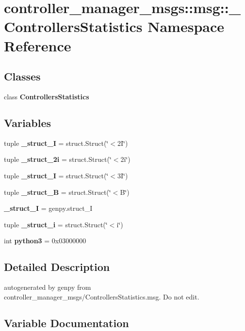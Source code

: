 \section{controller\-\_\-manager\-\_\-msgs\-:\-:msg\-:\-:\-\_\-\-Controllers\-Statistics \-Namespace \-Reference}
\label{namespacecontroller__manager__msgs_1_1msg_1_1__ControllersStatistics}
\subsection*{\-Classes}
\begin{DoxyCompactItemize}
\item 
class {\bf \-Controllers\-Statistics}
\end{DoxyCompactItemize}
\subsection*{\-Variables}
\begin{DoxyCompactItemize}
\item 
tuple {\bf \-\_\-struct\-\_\-I} = struct.\-Struct(\char`\"{}$<$2\-I\char`\"{})
\item 
tuple {\bf \-\_\-struct\-\_\-2i} = struct.\-Struct(\char`\"{}$<$2i\char`\"{})
\item 
tuple {\bf \-\_\-struct\-\_\-I} = struct.\-Struct(\char`\"{}$<$3\-I\char`\"{})
\item 
tuple {\bf \-\_\-struct\-\_\-\-B} = struct.\-Struct(\char`\"{}$<$\-B\char`\"{})
\item 
{\bf \-\_\-struct\-\_\-\-I} = genpy.\-struct\-\_\-\-I
\item 
tuple {\bf \-\_\-struct\-\_\-i} = struct.\-Struct(\char`\"{}$<$i\char`\"{})
\item 
int {\bf python3} = 0x03000000
\end{DoxyCompactItemize}


\subsection{\-Detailed \-Description}
\begin{DoxyVerb}autogenerated by genpy from controller_manager_msgs/ControllersStatistics.msg. Do not edit.\end{DoxyVerb}
 

\subsection{\-Variable \-Documentation}
